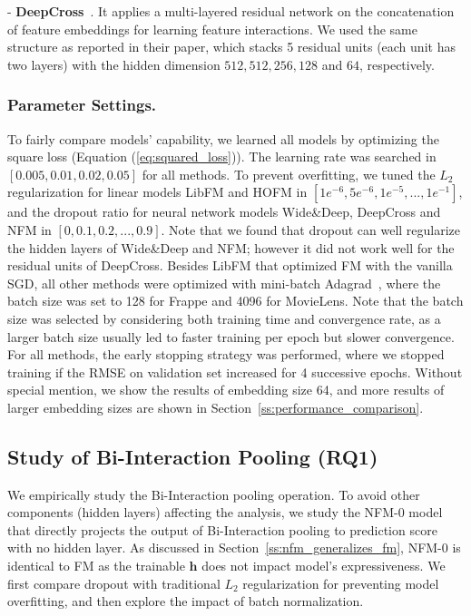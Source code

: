 - \textbf{DeepCross}~\cite{DeepCross}. It applies a multi-layered residual network on the concatenation of feature embeddings for learning feature interactions. We used the same structure as reported in their paper, which stacks 5 residual units (each unit has two layers) with the hidden dimension $512, 512, 256, 128$ and $64$, respectively. 

\subsubsection{\textbf{Parameter Settings.}}
To fairly compare models' capability, we learned all models by optimizing the square loss (Equation (\ref{eq:squared_loss})). The learning rate was searched in $[0.005, 0.01, 0.02, 0.05]$ for all methods. 
To prevent overfitting, we tuned the $L_2$ regularization for linear models LibFM and HOFM in $[1e^{-6},5e^{-6},1e^{-5},...,1e^{-1}]$, and the dropout ratio for neural network models Wide\&Deep, DeepCross and NFM in $[0,0.1,0.2,...,0.9]$. 
Note that we found that dropout can well regularize the hidden layers of Wide\&Deep and NFM; however it did not work well for the residual units of DeepCross. 
Besides LibFM that optimized FM with the vanilla SGD, all other methods were optimized with mini-batch Adagrad~\cite{Adagrad}, where the batch size was set to 128 for Frappe and 4096 for MovieLens. Note that the batch size was selected by considering both training time and convergence rate, as a larger batch size usually led to faster training per epoch but slower convergence. 
For all methods, the early stopping strategy was performed, where we stopped training if the RMSE on validation set increased for 4 successive epochs. 
Without special mention, we show the results of embedding size 64, and more results of larger embedding sizes are shown in Section~\ref{ss:performance_comparison}.

\subsection{Study of Bi-Interaction Pooling (RQ1)}
We empirically study the Bi-Interaction pooling operation. 
To avoid other components (\eg hidden layers) affecting the analysis, we study the NFM-0 model that directly projects the output of Bi-Interaction pooling to prediction score with no hidden layer. As discussed in Section~\ref{ss:nfm_generalizes_fm}, NFM-0 is identical to FM as the trainable $\textbf{h}$ does not impact model's expressiveness. We first compare dropout with traditional $L_2$ regularization for preventing model overfitting, and then explore the impact of batch normalization. 

